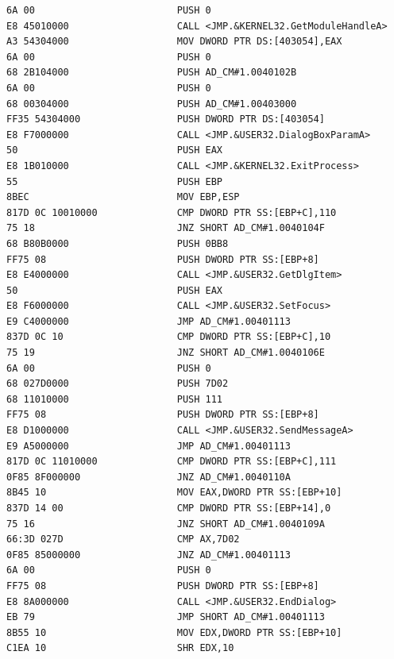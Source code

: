 \documentclass[times, utf8, diplomski, numeric]{fer}
\begin{document}
\begin{lstlisting}[frame=single, caption=Instrukcije unutar PE datoteke, label={lst:PE_instructions_full}]
6A 00	                      PUSH 0
E8 45010000                   CALL <JMP.&KERNEL32.GetModuleHandleA>
A3 54304000                   MOV DWORD PTR DS:[403054],EAX
6A 00                         PUSH 0                           
68 2B104000                   PUSH AD_CM#1.0040102B                    
6A 00                         PUSH 0                                    
68 00304000                   PUSH AD_CM#1.00403000                        
FF35 54304000                 PUSH DWORD PTR DS:[403054]                   
E8 F7000000                   CALL <JMP.&USER32.DialogBoxParamA>           
50                            PUSH EAX                                    
E8 1B010000                   CALL <JMP.&KERNEL32.ExitProcess>         
55                            PUSH EBP
8BEC                          MOV EBP,ESP
817D 0C 10010000              CMP DWORD PTR SS:[EBP+C],110
75 18                         JNZ SHORT AD_CM#1.0040104F
68 B80B0000                   PUSH 0BB8                                 
FF75 08                       PUSH DWORD PTR SS:[EBP+8]               
E8 E4000000                   CALL <JMP.&USER32.GetDlgItem>                 
50                            PUSH EAX                                       
E8 F6000000                   CALL <JMP.&USER32.SetFocus>                    
E9 C4000000                   JMP AD_CM#1.00401113
837D 0C 10                    CMP DWORD PTR SS:[EBP+C],10
75 19                         JNZ SHORT AD_CM#1.0040106E
6A 00                         PUSH 0              
68 027D0000                   PUSH 7D02 
68 11010000                   PUSH 111 
FF75 08                       PUSH DWORD PTR SS:[EBP+8] 
E8 D1000000                   CALL <JMP.&USER32.SendMessageA> 
E9 A5000000                   JMP AD_CM#1.00401113
817D 0C 11010000              CMP DWORD PTR SS:[EBP+C],111
0F85 8F000000                 JNZ AD_CM#1.0040110A
8B45 10                       MOV EAX,DWORD PTR SS:[EBP+10]
837D 14 00                    CMP DWORD PTR SS:[EBP+14],0
75 16                         JNZ SHORT AD_CM#1.0040109A
66:3D 027D                    CMP AX,7D02
0F85 85000000                 JNZ AD_CM#1.00401113
6A 00                         PUSH 0 
FF75 08                       PUSH DWORD PTR SS:[EBP+8]
E8 8A000000                   CALL <JMP.&USER32.EndDialog>
EB 79                         JMP SHORT AD_CM#1.00401113
8B55 10                       MOV EDX,DWORD PTR SS:[EBP+10]
C1EA 10                       SHR EDX,10

\end{lstlisting}
\end{document}
